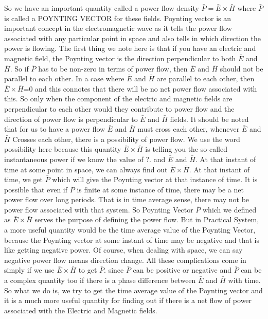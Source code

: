 So we have an important quantity called a power flow density $ \bar{P}=\bar{E}\times\bar{H} $ where $  \bar{P}  $ is called a POYNTING VECTOR for these fields. Poynting vector is an important concept in the electromagnetic wave as it tells the power flow associated with any particular point in space and also tells in which direction the power is flowing. The first thing we note here is that if you have an electric and magnetic field, the Poynting vector is the direction perpendicular to both $ \bar{E} $ and  $ \bar{H} $. So if $  \bar{P}  $  has to be non-zero in terms of power flow, then $ \bar{E} $ and  $ \bar{H} $ should not be parallel to each other. In a case where  $ \bar{E} $ and  $ \bar{H} $ are parallel to each other, then  $ \bar{E}\times\bar{H} $=0 and this connotes that there will be no net power flow associated with this. So only when the component of the electric and magnetic fields are perpendicular to each other would they contribute to power flow and the direction of power flow is perpendicular to $ \bar{E} $ and  $ \bar{H} $    fields. It should be noted that for us to have a power flow $ \bar{E} $ and  $ \bar{H} $  must cross each other, whenever $ \bar{E} $ and  $ \bar{H} $ Crosses each other, there is a possibility of power flow. We use the word possibility here because this quantity   $ \bar{E}\times\bar{H} $ is telling you the so-called instantaneous power if we know the value of ?. and  $ \bar{E} $ and  $ \bar{H} $. At that instant of time at some point in space, we can always find out $ \bar{E}\times\bar{H} $. At that instant of time, we get $  \bar{P}  $ which will give the Poynting vector at that instance of time. It is possible that even if $  \bar{P}  $ is finite at some instance of time, there may be a net power flow over long periods. That is in time average sense, there may not be power flow associated with that system. So Poynting Vector $  \bar{P}  $ which we defined as $ \bar{E}\times\bar{H} $  serves the purpose of defining the power flow. But in Practical System, a more useful quantity would be the time average value of the Poynting Vector, because the Poynting vector at some instant of time may be negative and that is like getting negative power. Of course, when dealing with space, we can say negative power flow means direction change. All these complications come in simply if we use $ \bar{E}\times\bar{H} $ to get  $  \bar{P}  $. since $  \bar{P}  $  can be positive or negative and $  \bar{P}  $  can be a complex quantity too if there is a phase difference between $ \bar{E} $ and  $ \bar{H} $ with time. So what we do is, we try to get the time average value of the Poynting vector and it is a much more useful quantity for finding out if there is a net flow of power associated with the Electric and Magnetic fields. 


